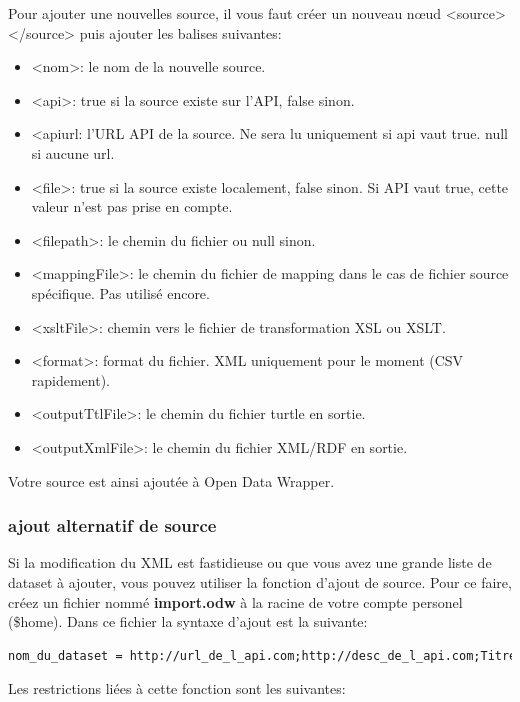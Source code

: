 \documentclass[a4paper]{article}
\begin{document}
Pour ajouter une nouvelles source, il vous faut créer un nouveau n\oe{}ud
<source></source> puis ajouter les balises suivantes:
\\

\begin{itemize}
  \item{<nom>}: le nom de la nouvelle source.
  \item{<api>}: true si la source existe sur l'API, false sinon.
  \item{<apiurl}: l'URL API de la source. Ne sera lu uniquement si api vaut
  true. null si aucune url.
  \item{<file>}: true si la source existe localement, false sinon. Si API vaut
  true, cette valeur n'est pas prise en compte.
  \item{<filepath>}: le chemin du fichier ou null sinon.
  \item{<mappingFile>}: le chemin du fichier de mapping dans le cas de fichier
  source spécifique. Pas utilisé encore.
  \item{<xsltFile>}: chemin vers le fichier de transformation XSL ou XSLT.
  \item{<format>}: format du fichier. XML uniquement pour le moment (CSV
  rapidement).
  \item{<outputTtlFile>}: le chemin du fichier turtle en sortie.
  \item{<outputXmlFile>}: le chemin du fichier XML/RDF en sortie.
\end{itemize}

Votre source est ainsi ajoutée à Open Data Wrapper.

\subsubsection{ajout alternatif de source}

Si la modification du XML est fastidieuse ou que vous avez une grande liste de
dataset à ajouter, vous pouvez utiliser la fonction d'ajout de source. Pour ce
faire, créez un fichier nommé \textbf{import.odw} à la racine de votre compte
personel (\$home). Dans ce fichier la syntaxe d'ajout est la suivante: 

\begin{lstlisting}[caption=syntaxe import.odw, language=XML]
nom_du_dataset = http://url_de_l_api.com;http://desc_de_l_api.com;Titre_de_l_api;Publisher_de_l_api
\end{lstlisting}

Les restrictions liées à cette fonction sont les suivantes:
\end{document}
